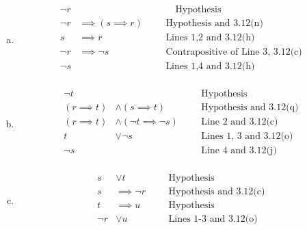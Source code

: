 \documentclass[12pt]{scrartcl} %
\begin{document}
\begin{enumerate}[(a)]
	\item \begin{align}
	\neg r & & & & \quad \text{Hypothesis}\tag{1}\\
	\neg r &\implies (s \implies r) & & & \text{Hypothesis and 3.12(n)}\tag{2}\\
	s &\implies r & & & \text{Lines 1,2 and 3.12(h)}\tag{3} \\
	\neg r &\implies \neg s & & & \text{Contrapositive of Line 3, 3.12(c)}\tag{4} \\
	\neg s & & & & \text{Lines 1,4 and 3.12(h)}\tag{5}\\ 
	\end{align}

	\item \begin{align}
	\neg t & & & & \text{Hypothesis}\tag{1} \\
	(r \implies t) &\land (s \implies t) & & & \text{Hypothesis and 3.12(q)}\tag{2}\\
	(r \implies t) &\land (\neg t \implies \neg s) & & & \text{Line 2 and 3.12(c)}\tag{3}\\
	t &\lor \neg s & & & \text{Lines 1, 3 and 3.12(o)}\tag{4} \\
	\neg s & & & & \text{Line 4 and 3.12(j)}\tag{5} \\ 
	\end{align}
	
	\item \begin{align}
	s &\lor t & & & \text{Hypothesis}\tag{1} \\
	s &\implies \neg r & & & \text{Hypothesis and 3.12(c)}\tag{2}\\
	t &\implies u & & & \text{Hypothesis}\tag{3}\\
	\neg r &\lor u & & & \text{Lines 1-3 and 3.12(o)}\tag{4} \\
	\end{align}
\end{enumerate}
\end{document}
